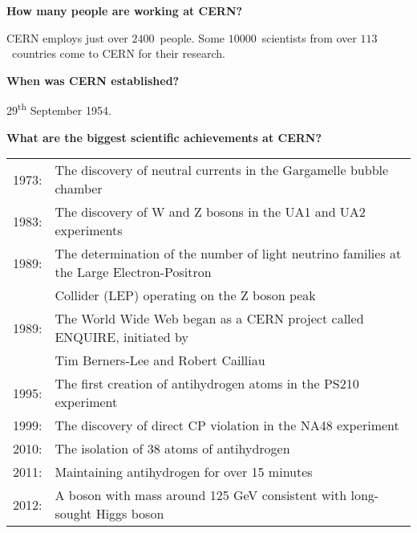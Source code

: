 \documentclass{atlasnote}
\newenvironment{question} %
{\noindent\bfseries}
{\par}
\newenvironment{answer} %
{}
{\vspace*{10pt}}
\newenvironment{faq} %
{\par\noindent\begin{minipage}{\linewidth}}
    {\end{minipage}\par}
\begin{document}
\begin{faq}
    \begin{question}
        How many people are working at CERN?
    \end{question}
    \begin{answer}
        CERN employs just over $2400$~people. Some $10000$~scientists from over $113$~countries come to CERN for their research.
    \end{answer}
\end{faq}

\begin{faq}
    \begin{question}
        When was CERN established?
    \end{question}
    \begin{answer}
        29\textsuperscript{th} September 1954.
    \end{answer}
\end{faq}

\begin{faq}
    \begin{question}
        What are the biggest scientific achievements at CERN?
    \end{question}
    \begin{answer}
        \begin{tabular}{l l}
            1973: & The discovery of neutral currents in the Gargamelle bubble chamber\\
            1983: & The discovery of W and Z bosons in the UA1 and UA2 experiments\\
            1989: & The determination of the number of light neutrino families at the Large Electron-Positron\\
            & Collider (LEP) operating on the Z boson peak\\
            1989: & The World Wide Web began as a CERN project called ENQUIRE, initiated by\\
            & Tim Berners-Lee and Robert Cailliau\\
            1995: & The first creation of antihydrogen atoms in the PS210 experiment\\
            1999: & The discovery of direct CP violation in the NA48 experiment\\
            2010: & The isolation of 38 atoms of antihydrogen\\
            2011: & Maintaining antihydrogen for over 15 minutes\\
            2012: & A boson with mass around 125 GeV consistent with long-sought Higgs boson\\
        \end{tabular}
    \end{answer}
\end{faq}
\end{document}
